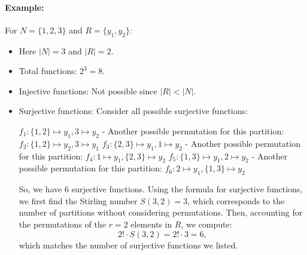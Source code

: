 \documentclass{article}
\begin{document}
\paragraph{Example:}  
For \( N = \{1, 2, 3\} \) and \( R = \{y_1, y_2\} \):
\begin{itemize}[nosep]
    \item[] Here \( |N| = 3 \) and \( |R| = 2 \).
    \item Total functions: $2^3 = 8$.
    \item Injective functions: Not possible since $|R|<|N|$.
    \item Surjective functions: Consider all possible surjective functions:

 \( f_1: \{1, 2\} \mapsto y_1, 3 \mapsto y_2 \)
- Another possible permutation for this partition: \( f_2: \{1, 2\} \mapsto y_2, 3 \mapsto y_1 \)
 \( f_3: \{2, 3\} \mapsto y_1, 1 \mapsto y_2 \)
- Another possible permutation for this partition: \( f_4: 1 \mapsto y_1, \{2, 3\} \mapsto y_2 \)
 \( f_5: \{1, 3\} \mapsto y_1, 2 \mapsto y_2 \)
- Another possible permutation for this partition: \( f_6: 2 \mapsto y_1, \{1, 3\} \mapsto y_2 \)

So, we have 6 surjective functions. Using the formula for surjective functions, we first find the Stirling number \( S(3, 2) = 3 \), which corresponds to the number of partitions without considering permutations. Then, accounting for the permutations of the \( r = 2 \) elements in \( R \), we compute:
\[
2! \cdot S(3, 2) = 2! \cdot 3 = 6,
\]
which matches the number of surjective functions we listed.
\end{itemize}
\end{document}
